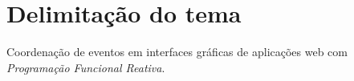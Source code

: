 \section{Delimitação do tema}\label{ldelimitacao}

Coordenação de eventos em interfaces gráficas de aplicações web
com \emph{Programação Funcional Reativa}.
